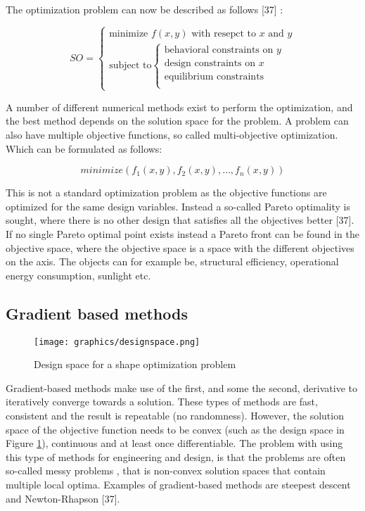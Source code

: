 The optimization problem can now be described as follows [37] :

\begin{equation}
SO=\begin{cases}
    \textrm{minimize } f(x,y) \textrm{ with resepct to } x \textrm{ and } y \\
    {\textrm{subject to} \begin{cases}
        \textrm{behavioral constraints on } y\\
        \textrm{design constraints on } x\\
	\textrm{equilibrium constraints} \\
    \end{cases}}
      \end{cases}
    \end{equation} 


 A number of different numerical methods exist to perform the optimization, and the best method depends on the solution space for the problem. A problem can also have multiple objective functions, so called multi-objective optimization. Which can be formulated as follows:

\begin{equation*}
minimize(f_1(x,y),f_2(x,y), \dotsc, f_n(x,y))
\end{equation*}

This is not a standard optimization problem as the objective functions are optimized for the same design variables. Instead a so-called Pareto optimality is sought, where there is no other design that satisfies all the objectives better [37]. If no single Pareto optimal point exists instead a Pareto front can be found in the objective space, where the objective space is a space with the different objectives on the axis. The objects can for example be, structural efficiency, operational energy consumption, sunlight etc.

\subsection{Gradient based methods}
\begin{figure}
  \texttt{[image: graphics/designspace.png]}
  \caption{Design space for a shape optimization problem}
  \label{fig:designspace}
\end{figure}

Gradient-based methods make use of the first, and some the second, derivative to iteratively converge towards a solution. These types of methods are fast, consistent and the result is repeatable (no randomness). However, the solution space of the objective function needs to be convex (such as the design space in Figure \ref{fig:designspace}), continuous and at least once differentiable. The problem with using this type of methods for engineering and design, is that the problems are often so-called messy problems \cite{schlaich2006challenges}, that is non-convex solution spaces that contain multiple local optima. Examples of gradient-based methods are steepest descent and Newton-Rhapson [37]. 

